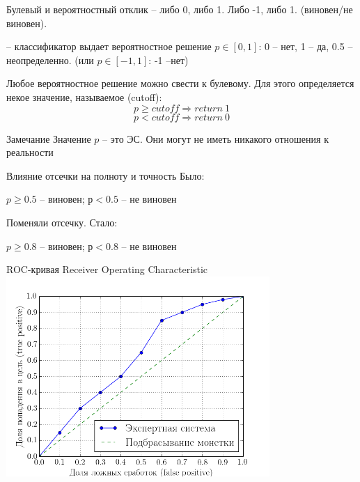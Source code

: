   \begin{frame}{Булевый и вероятностный отклик}
  \small
   -- либо 0, либо 1. Либо -1, либо 1. (виновен/не виновен).
  
   -- классификатор выдает вероятностное 
   решение $p \in [0, 1]$:
  0 -- нет, 1 -- да, 0.5 -- неопределенно.
  (или $p \in [-1, 1]$: -1 --нет)
  
  Любое вероятностное решение можно свести к булевому.
  Для этого определяется некое значение, называемое
   (cutoff):
  \begin{equation}
  p \geqslant cutoff \Longrightarrow return ~ 1
  \end{equation}
  \begin{equation*}
  p < cutoff \Longrightarrow return ~ 0
  \end{equation*}
  
  \begin{block}{Замечание}
  Значение $p$ -- это  ЭС.
  Они могут не иметь никакого отношения к реальности
  \end{block}
  \end{frame}

  \begin{frame}{Влияние отсечки на полноту и точность}
  Было: 
  \begin{center}
   $p \geqslant 0.5$ – виновен; $р<0.5$ – не виновен
\end{center}
  Поменяли отсечку. Стало:
  \begin{center}
     $p \geqslant 0.8$ – виновен; $р<0.8$ – не виновен
  \end{center}
   
  \end{frame}

  \begin{frame}{ROC-кривая}
  \centering
   Receiver Operating Characteristic
   \includegraphics[width=10cm]{../pic/roc_example.png}
   \end{frame}

